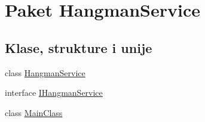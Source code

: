 \hypertarget{namespaceHangmanService}{}\section{Paket Hangman\+Service}
\label{namespaceHangmanService}
\subsection*{Klase, strukture i unije}
\begin{DoxyCompactItemize}
\item 
class \hyperlink{classHangmanService_1_1HangmanService}{Hangman\+Service}
\item 
interface \hyperlink{interfaceHangmanService_1_1IHangmanService}{I\+Hangman\+Service}
\item 
class \hyperlink{classHangmanService_1_1MainClass}{Main\+Class}
\end{DoxyCompactItemize}
